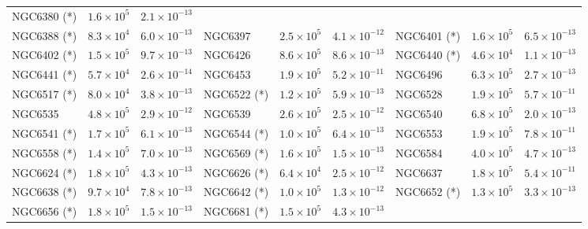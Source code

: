 \begin{table}
\begin{center}
\begin{tabular}{l | c | c | l |  c|   c | l | c | c }
            NGC6380 (*) &  $1.6\times10^5$ &          $2.1\times10^{-13}$ \\
            NGC6388 (*) &  $8.3\times10^4$ &          $6.0\times10^{-13}$ &
            NGC6397 &  $2.5\times10^5$ &          $4.1\times10^{-12}$ &
            NGC6401 (*) &  $1.6\times10^5$ &          $6.5\times10^{-13}$  \\
            NGC6402 (*) &  $1.5\times10^5$ &          $9.7\times10^{-13}$  &
            NGC6426 &  $8.6\times10^5$ &          $8.6\times10^{-13}$  &
            NGC6440 (*) &  $4.6\times10^4$ &         $ 1.1\times10^{-13}$  \\
            NGC6441 (*) &  $5.7\times10^4$ &          $2.6\times10^{-14}$  &
            NGC6453 &  $1.9\times10^5$ &          $5.2\times10^{-11}$  &
            NGC6496 &  $6.3\times10^5$ &          $2.7\times10^{-13}$  \\
            NGC6517 (*) &  $8.0\times10^4$ &          $3.8\times10^{-13}$  &
            NGC6522 (*) &  $1.2\times10^5$ &          $5.9\times10^{-13}$  &
            NGC6528 &  $1.9\times10^5$ &          $5.7\times10^{-11}$  \\
            NGC6535 &  $4.8\times10^5$ &        $  2.9\times10^{-12}$ &
            NGC6539 &  $2.6\times10^5$ &          $2.5\times10^{-12}$  &
            NGC6540 &  $6.8\times10^5$ &          $2.0\times10^{-13}$  \\
            NGC6541 (*) &  $1.7\times10^5$ &          $6.1\times10^{-13}$  &
            NGC6544 (*) &  $1.0\times10^5$ &          $6.4\times10^{-13}$  &
            NGC6553 &  $1.9\times10^5$ &          $7.8\times10^{-11}$  \\
            NGC6558 (*) &  $1.4\times10^5$ &          $7.0\times10^{-13}$  &
            NGC6569 (*) &  $1.6\times10^5$ &          $1.5\times10^{-13}$  &
            NGC6584 &  $4.0\times10^5$ &          $4.7\times10^{-13}$  \\
            NGC6624 (*) &  $1.8\times10^5$ &          $4.3\times10^{-13}$  &
            NGC6626 (*) &  $6.4\times10^4$ &          $2.5\times10^{-12}$  &
            NGC6637 &  $1.8\times10^5$ &          $5.4\times10^{-11}$  \\
            NGC6638 (*) &  $9.7\times10^4$ &          $7.8\times10^{-13}$  &
            NGC6642 (*) &  $1.0\times10^5$ &          $1.3\times10^{-12}$ &
            NGC6652 (*)&  $1.3\times10^5$ &          $3.3\times10^{-13}$  \\
            NGC6656 (*) &  $1.8\times10^5$ &          $1.5\times10^{-13}$ &
            NGC6681 (*) &  $1.5\times10^5$ &          $4.3\times10^{-13}$  &

\end{tabular}
\end{center}
\end{table}
